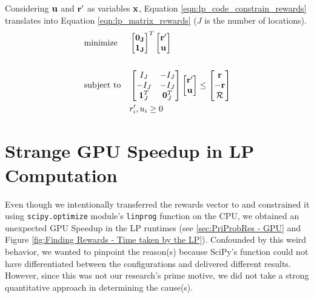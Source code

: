 \begin{appendices}
    Considering $\mathbf{u}$ and $\mathbf{r'}$ as variables $\mathbf{x}$, Equation \ref{eqn:lp_code_constrain_rewards} translates into Equation \ref{eqn:lp_matrix_rewards} ($J$ is the number of locations).
    \begin{equation} \label{eqn:lp_matrix_rewards}
    \begin{aligned}
    & \text{minimize}
    & & \begin{bmatrix}
    \mathbf{0_J}\\
    \mathbf{1_J}\\
    \end{bmatrix}^T
    \begin{bmatrix}
    \mathbf{r'}\\
    \mathbf{u}
    \end{bmatrix}\\ \\
    & \text{subject to}
    & & \begin{bmatrix}
    I_J & -I_J\\
    -I_J & -I_J\\
    \mathbf{1}^T_J & \mathbf{0}^T_J\\
    \end{bmatrix}
    \begin{bmatrix}
    \mathbf{r'}\\
    \mathbf{u}\\
    \end{bmatrix} \leq
    \begin{bmatrix}
    \mathbf{r}\\
    -\mathbf{r}\\
    \mathcal{R}\\
    \end{bmatrix}\\
    &&& r'_i, u_i \geq 0
    \end{aligned}
    \end{equation}
    
    \section{Strange GPU Speedup in LP Computation} \label{app:Strange GPU Speedup in LP Computation}
    Even though we intentionally transferred the rewards vector to and constrained it using \texttt{scipy.optimize} module's \texttt{linprog} function on the CPU, we obtained an unexpected GPU Speedup in the LP runtimes (see \cref{sec:PriProbRes - GPU} and Figure \ref{fig:Finding Rewards - Time taken by the LP}). Confounded by this weird behavior, we wanted to pinpoint the reason(s) because SciPy's function could not have differentiated between the configurations and delivered different results. However, since this was not our research's prime motive, we did not take a strong quantitative approach in determining the cause(s).
    

\end{appendices}
